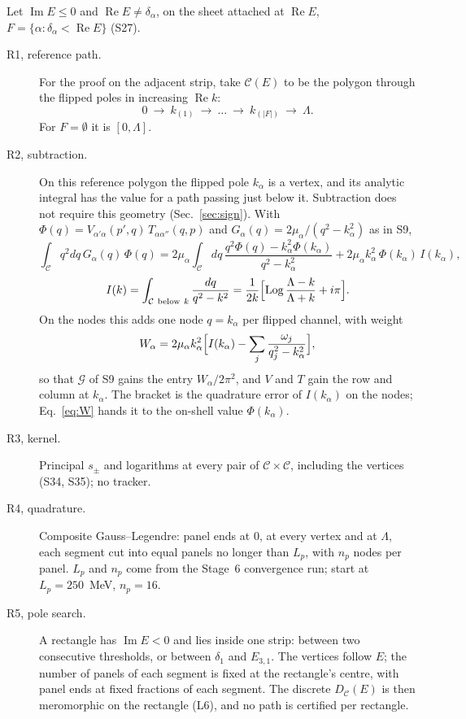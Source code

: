 \documentclass[11pt]{article}
\begin{document}
Let $\operatorname{Im}E\le0$ and $\operatorname{Re}E\ne\delta_\alpha$, on the sheet attached at $\operatorname{Re}E$, $F=\{\alpha:\delta_\alpha<\operatorname{Re}E\}$ (S27).
\begin{description}
\item[R1, reference path.] For the proof on the adjacent strip, take $\mathcal C(E)$ to be the polygon through the flipped poles in increasing $\operatorname{Re}k$:
\[
0\ \to\ k_{(1)}\ \to\ \dots\ \to\ k_{(|F|)}\ \to\ \Lambda .
\]
For $F=\emptyset$ it is $[0,\Lambda]$.
\item[R2, subtraction.] On this reference polygon the flipped pole $k_\alpha$ is a vertex, and its analytic integral has the value for a path passing just below it. Subtraction does not require this geometry (Sec.~\ref{sec:sign}). With $\Phi(q)=V_{\alpha'\alpha}(p',q)\,T_{\alpha\alpha''}(q,p)$ and $G_\alpha(q)=2\mu_\alpha/(q^2-k_\alpha^2)$ as in S9,
\begin{equation}\label{eq:split}
\int_{\mathcal C}q^2dq\,G_\alpha(q)\,\Phi(q)=2\mu_\alpha\int_{\mathcal C}dq\,\frac{q^2\Phi(q)-k_\alpha^2\Phi(k_\alpha)}{q^2-k_\alpha^2}+2\mu_\alpha k_\alpha^2\,\Phi(k_\alpha)\,I(k_\alpha),
\end{equation}
\begin{equation}\label{eq:I}
I(k)=\int_{\mathcal C\ \text{below}\ k}\frac{dq}{q^2-k^2}=\frac1{2k}\Bigl[\operatorname{Log}\frac{\Lambda-k}{\Lambda+k}+i\pi\Bigr].
\end{equation}
On the nodes this adds one node $q=k_\alpha$ per flipped channel, with weight
\begin{equation}\label{eq:W}
W_\alpha=2\mu_\alpha k_\alpha^2\Bigl[I(k_\alpha)-\sum_j\frac{\omega_j}{q_j^2-k_\alpha^2}\Bigr],
\end{equation}
so that $\mathcal G$ of S9 gains the entry $W_\alpha/2\pi^2$, and $V$ and $T$ gain the row and column at $k_\alpha$. The bracket is the quadrature error of $I(k_\alpha)$ on the nodes; Eq.~\eqref{eq:W} hands it to the on-shell value $\Phi(k_\alpha)$.
\item[R3, kernel.] Principal $s_\pm$ and logarithms at every pair of $\mathcal C\times\mathcal C$, including the vertices (S34, S35); no tracker.
\item[R4, quadrature.] Composite Gauss--Legendre: panel ends at $0$, at every vertex and at $\Lambda$, each segment cut into equal panels no longer than $L_p$, with $n_p$ nodes per panel. $L_p$ and $n_p$ come from the Stage~6 convergence run; start at $L_p=250$~MeV, $n_p=16$.
\item[R5, pole search.] A rectangle has $\operatorname{Im}E<0$ and lies inside one strip: between two consecutive thresholds, or between $\delta_1$ and $E_{3,1}$. The vertices follow $E$; the number of panels of each segment is fixed at the rectangle's centre, with panel ends at fixed fractions of each segment. The discrete $D_{\mathcal C}(E)$ is then meromorphic on the rectangle (L6), and no path is certified per rectangle.

\end{description}
\end{document}
